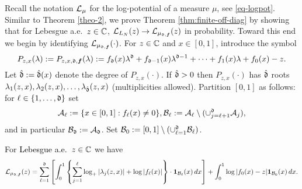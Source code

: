 \documentclass{amsart}
\numberwithin{equation}{section}
\def\corAB{}
\def\corOZ{}
\def\corABrev{\textcolor{black}}
\begin{document}
\corOZ{Recall
  the notation $\mathcal{L}_\mu$ for the log-potential of a measure $\mu$,
  see \eqref{eq-logpot}.}
Similar to Theorem \ref{theo-2},
we prove Theorem
\ref{thm:finite-off-diag} by showing that for
Lebesgue a.e.~$z \in \mathbb{C}$, $\mathcal{L}_{L_N}(z)\to \mathcal{L}_{\mu_{\mathfrak{d}, {\bm f}}}(z)$
in probability.
Toward this end we begin by identifying
$\mathcal{L}_{\mu_{\mathfrak{d}, {\bm f}}}(\cdot)$.
For $z \in \mathbb{C} $
and  $x \in [0,1]$, introduce the symbol
\begin{equation}
  \label{eq-symbol}
P_{z,x}(\lambda):=P_{z,x,\mathfrak{d},{\bm f}}(\lambda):= f_{\mathfrak{d}}(x)\lambda^{\mathfrak{d}}+ f_{\mathfrak{d}-1}(x)\lambda^{\mathfrak{d}-1}+\cdots+f_1(x)\lambda +f_0(x)- z.
\end{equation}
Let
$\hat{\mathfrak{d}}:=\hat{\mathfrak{d}}(x)$ denote the degree of $P_{z,x}(\cdot)$.
If $\hat{\mathfrak{d}}>0$ then  $P_{z,x}(\cdot)$ has
$\hat{\mathfrak{d}}$ roots
$\lambda_1(z,x),\lambda_2(z,x),\ldots,\lambda_{\hat{\mathfrak{d}}}(z,x)$
(multiplicities allowed).
Partition $[0,1]$ as follows:
for $\ell \in \{1,\ldots,\corABrev{\gd}\}$ set
\begin{equation}
  \label{eq-Part}
  \mathcal{A}_\ell:=\{x \in [0,1]: f_\ell (x) \ne 0\},
\mathcal{B}_\ell:=\mathcal{A}_\ell
\setminus (\cup_{j=\ell+1}^{\mathfrak{d}}\mathcal{A}_j),
\end{equation}
and in
particular $\mathcal{B}_{\mathfrak{d}}:=\mathcal{A}_{\mathfrak{d}}$.
Set $\mathcal{B}_0:=[0,1]
\setminus (\cup_{\ell=1}^{\mathfrak{d}} \mathcal{B}_\ell)$.
\begin{lemma}\label{lem:limit-log-potential}
For \corABrev{Lebesgue a.e.}~$z \in \mathbb{C}$ we have
\begin{equation}\label{eq:limit-log-pot}
\mathcal{L}_{\mu_{\mathfrak{d}, {\bm f}}}(z)= \sum_{\ell=1}^{\mathfrak{d}} \left[\int_0^1 \left\{\sum_{j=1}^\ell \log_+ |\lambda_j(z,x)| + \log |f_\ell(x)|\right\} \cdot {\bf 1}_{\mathcal{B}_\ell}(x) \, dx\right] + \int_0^1\log |f_0(x) -z| {\bf 1}_{\mathcal{B}_0}(x) \, dx.
\end{equation}
\end{lemma}
\end{document}
